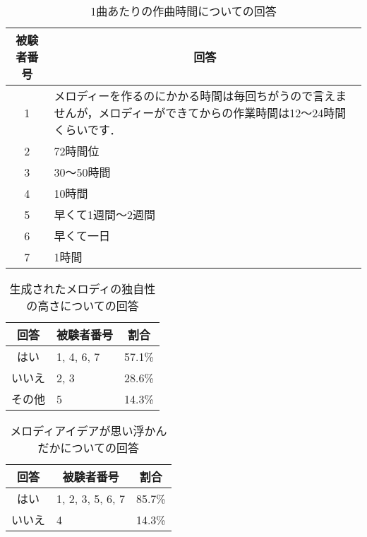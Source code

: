 \begin{table}[htbp]
  \begin{center}
    \caption{1曲あたりの作曲時間についての回答}
    \begin{tabular}{|c|p{30em}|}
      \hline
      \multicolumn{1}{|c|}{被験者番号} & \multicolumn{1}{c|}{回答} \rule[-3mm]{-1.3mm}{8mm} \\ \hline
      1 & メロディーを作るのにかかる時間は毎回ちがうので言えませんが，メロディーができてからの作業時間は12～24時間くらいです．\rule[-3mm]{0mm}{8mm} \\ \hline
      2 & 72時間位\rule[-3mm]{0mm}{8mm} \\ \hline
      3 & 30〜50時間\rule[-3mm]{0mm}{8mm} \\ \hline
      4 & 10時間\rule[-3mm]{0mm}{8mm} \\ \hline
      5 & 早くて1週間〜2週間\rule[-3mm]{0mm}{8mm} \\ \hline
      6 & 早くて一日\rule[-3mm]{0mm}{8mm} \\ \hline
      7 & 1時間\rule[-3mm]{0mm}{8mm} \\ \hline
    \end{tabular}
  \end{center}
\end{table}

\begin{table}[htbp]
  \begin{center}
    \caption{生成されたメロディの独自性の高さについての回答}
    \begin{tabular}{|c|p{10em}|c|}
      \hline
      回答 & \multicolumn{1}{c|}{被験者番号} & 割合\rule[-3mm]{0mm}{8mm} \\ \hline \hline
      はい & 1, 4, 6, 7 & 57.1\% \rule[-3mm]{0mm}{8mm} \\ \hline
      いいえ & 2, 3 & 28.6\% \rule[-3mm]{0mm}{8mm} \\ \hline
      その他 & 5 & 14.3\% \rule[-3mm]{0mm}{8mm} \\ \hline
    \end{tabular}
  \end{center}
\end{table}

\begin{table}[htbp]
  \begin{center}
    \caption{メロディアイデアが思い浮かんだかについての回答}
    \begin{tabular}{|c|p{10em}|c|}
      \hline
      回答 & \multicolumn{1}{c|}{被験者番号} & 割合\rule[-3mm]{0mm}{8mm} \\ \hline \hline
      はい & 1, 2, 3, 5, 6, 7 & 85.7\% \rule[-3mm]{0mm}{8mm} \\ \hline
      いいえ & 4 & 14.3\% \rule[-3mm]{0mm}{8mm} \\ \hline
    \end{tabular}
  \end{center}
\end{table}

